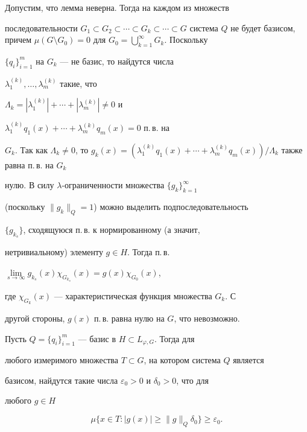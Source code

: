  


 


\begin{pf} 


Допустим, что лемма неверна. Тогда на каждом из множеств 


последовательности $G_1\subset G_2\subset \dotsb \subset G_k\subset 


\dotsb \subset G$ система $Q$ не будет базисом, причем $\mu(G\setminus 


G_0)=0$ для $G_0=\bigcup\limits^\infty_{k=1}G_k$. Поскольку 


$\{q_i\}^m_{i=1}$ на $G_k$ --- не базис, то найдутся числа 


$\lambda^{(k)}_1,\dotsc,\lambda^{(k)}_m$ такие, что 


$\Lambda_k=|\lambda_1^{(k)}|+ \dotsb+ |\lambda^{(k)}_m|\ne0$ и 


$\lambda^{(k)}_1q_1(x)+ \dotsb+ \lambda^{(k)}_m q_m(x)=0$ п.\,в. на 


$G_k$. Так как $\Lambda_k\ne0$, то $g_k(x)=(\lambda_1^{(k)}q_1(x)+ 


\dotsb+ \lambda_m^{(k)}q_m(x))/\Lambda_k$ также равна п.\,в. на $G_k$ 


нулю. В силу $\lambda$-огра\-ни\-ченности множества $\{g_k\}^\infty_{k=1}$ 


(поскольку $\|g_k\|_Q=1$) можно выделить подпоследовательность 


$\{g_{k_s}\}$, сходящуюся п.\,в. к нормированному (а значит, 


нетривиальному) элементу $g\in H$. Тогда п.\,в. 


$\lim\limits_{s\to\infty}g_{k_s}(x)\chi_{G_{k_s}}(x)= g(x)\chi_{G_0}(x)$, 


где $\chi_{G_k}(x)$ --- характеристическая функция множества $G_k$. С 


другой стороны, $g(x)$ п.\,в. равна нулю на $G$, что невозможно. 


\end{pf} 


 


 


\begin{lem} 


Пусть $Q=\{q_i\}^m_{i=1}$ --- базис в $H\subset L_{\varphi,G}$. Тогда для 


любого измеримого множества $T\subset G$, на котором система $Q$ является 


базисом, найдутся такие числа $\varepsilon_0>0$ и $\delta_0>0$, что для 


любого $g\in H$ 


$$ 


\mu\{x\in T:|g(x)|\ge\|g\|_Q\delta_0\}\ge\varepsilon_0. 


$$ 


\end{lem} 


